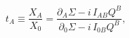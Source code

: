 \begin{equation} \label{modsol}
 t_A \equiv \frac{X_A}{X_0} =
 \frac{\partial_A \Sigma - i\, I_{AB} Q^B}{\partial_0 \Sigma - i\, I_{0B}
 Q^B},
\end{equation}


